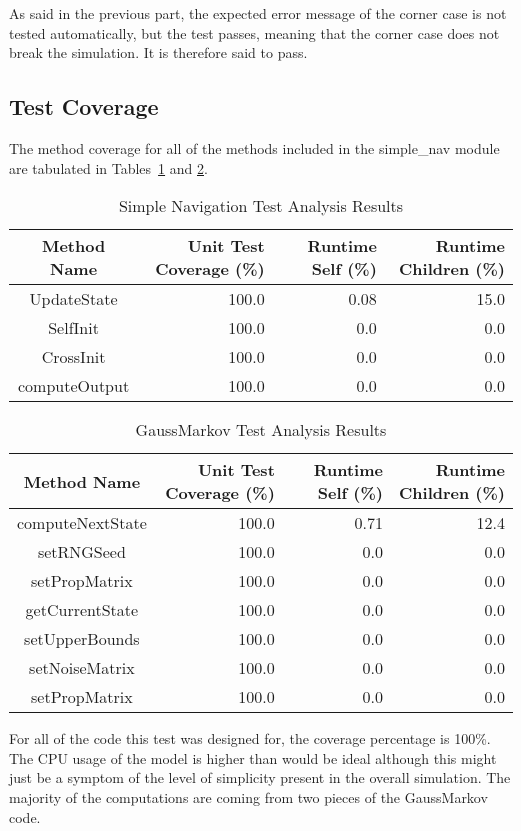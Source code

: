As said in the previous part, the expected error message of the corner case is not tested automatically,
but the test passes, meaning that the corner case does not break the simulation. It is therefore said to
pass.



\subsection{Test Coverage}
The method coverage for all of the methods included in the simple\_nav 
module are tabulated in Tables~\ref{tab:cov_met} and \ref{tab:cov_met2}.

\begin{table}[htbp]
    \caption{Simple Navigation Test Analysis Results}
   \label{tab:cov_met}
        \centering \fontsize{10}{10}\selectfont
   \begin{tabular}{c | r | r | r} %
      \hline
      Method Name    & Unit Test Coverage (\%) & Runtime Self (\%) & Runtime Children (\%) \\
      \hline
      UpdateState & 100.0 & 0.08 & 15.0 \\
      SelfInit & 100.0 & 0.0 & 0.0 \\
      CrossInit & 100.0 & 0.0 & 0.0 \\
      computeOutput & 100.0 & 0.0 & 0.0 \\
      \hline
   \end{tabular}
\end{table}

\begin{table}[htbp]
    \caption{GaussMarkov Test Analysis Results}
   \label{tab:cov_met2}
        \centering \fontsize{10}{10}\selectfont
   \begin{tabular}{c | r | r | r} %
      \hline
      Method Name    & Unit Test Coverage (\%) & Runtime Self (\%) & Runtime Children (\%) \\
      \hline
      computeNextState & 100.0 & 0.71 & 12.4 \\
      setRNGSeed & 100.0 & 0.0 & 0.0 \\
      setPropMatrix & 100.0 & 0.0 & 0.0 \\
      getCurrentState & 100.0 & 0.0 & 0.0 \\
      setUpperBounds & 100.0 & 0.0 & 0.0 \\
      setNoiseMatrix & 100.0 & 0.0 & 0.0 \\
      setPropMatrix & 100.0 & 0.0 & 0.0 \\
      \hline
   \end{tabular}
\end{table}
For all of the code this test was designed for, the coverage percentage is 
100\%.  The CPU usage of the model is higher than would be ideal although this 
might just be a symptom of the level of simplicity present in the overall 
simulation.  The majority of the computations are coming from two pieces of the 
GaussMarkov code.  

